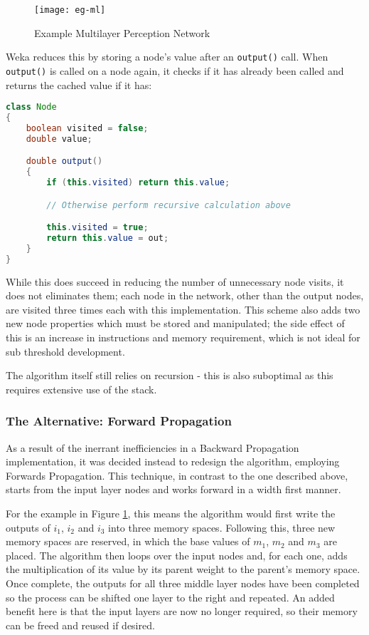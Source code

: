 \begin{figure}[!h]
    \centering
    \texttt{[image: eg-ml]}
    \caption{Example Multilayer Perception Network}
    \label{fig:eg-ml}
\end{figure}

Weka reduces this by storing a node's value after an \verb|output()| call. When \verb|output()| is called on a node again, it checks if it has already been called and returns the cached value if it has:

\begin{lstlisting}[language=Java,caption={Weka's method of preventing repeated calculations}]
class Node
{
    boolean visited = false;
    double value;

    double output()
    {
        if (this.visited) return this.value;

        // Otherwise perform recursive calculation above

        this.visited = true;
        return this.value = out;
    }
}
\end{lstlisting}

While this does succeed in reducing the number of unnecessary node visits, it does not eliminates them; each node in the network, other than the output nodes, are visited three times each with this implementation. This scheme also adds two new node properties which must be stored and manipulated; the side effect of this is an increase in instructions and memory requirement, which is not ideal for sub threshold development.

The algorithm itself still relies on recursion - this is also suboptimal as this requires extensive use of the stack.

\subsubsection{The Alternative: Forward Propagation}

As a result of the inerrant inefficiencies in a Backward Propagation implementation, it was decided instead to redesign the algorithm, employing Forwards Propagation. This technique, in contrast to the one described above, starts from the input layer nodes and works forward in a width first manner.

For the example in Figure \ref{fig:eg-ml}, this means the algorithm would first write the outputs of $i_1$, $i_2$ and $i_3$ into three memory spaces. Following this, three new memory spaces are reserved, in which the base values of $m_1$, $m_2$ and $m_3$ are placed. The algorithm then loops over the input nodes and, for each one, adds the multiplication of its value by its parent weight to the parent's memory space. Once complete, the outputs for all three middle layer nodes have been completed so the process can be shifted one layer to the right and repeated. An added benefit here is that the input layers are now no longer required, so their memory can be freed and reused if desired.

